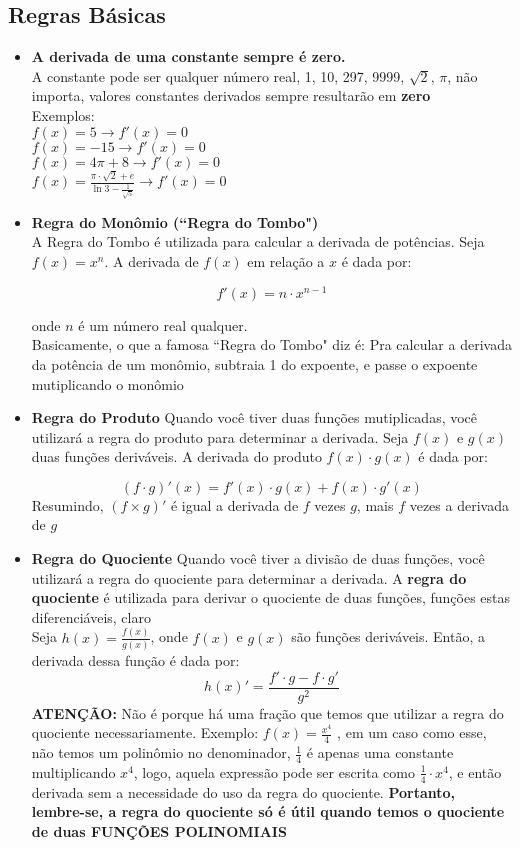 \documentclass{article}
\begin{document}
\subsection{Regras Básicas}
\begin{itemize}
    \item \textbf{A derivada de uma constante sempre é zero.}\\[10pt]A constante pode ser qualquer número real, 1, 10, 297, 9999, $\sqrt{2}$, $\pi$, não importa, valores constantes derivados sempre resultarão em \textbf{zero}\\[10pt]
    Exemplos:\\$f(x) = 5 \xrightarrow{} f'(x) = 0$\\$f(x) = -15 \xrightarrow{} f'(x) = 0$\\$f(x) = 4 \pi + 8 \xrightarrow{} f'(x) = 0$\\$f(x) = \frac{\pi \cdot \sqrt{2} + e}{\ln 3 - \frac{1}{\sqrt{5}}} \xrightarrow{} f'(x) = 0$

    \item \textbf{Regra do Monômio (``Regra do Tombo")}\\[10pt]
A Regra do Tombo é utilizada para calcular a derivada de potências. Seja \( f(x) = x^n \). A derivada de \( f(x) \) em relação a \( x \) é dada por:

\[
f'(x) = n \cdot x^{n-1}
\]

onde \( n \) é um número real qualquer.\\[10pt]Basicamente, o que a famosa ``Regra do Tombo" diz é: Pra calcular a derivada da potência de um monômio, subtraia 1 do expoente, e passe o expoente  mutiplicando o monômio

\item \textbf{Regra do Produto}
Quando você tiver duas funções mutiplicadas, você utilizará a regra do produto para determinar a derivada. Seja \( f(x) \) e \( g(x) \) duas funções deriváveis. A derivada do produto \( f(x) \cdot g(x) \) é dada por:

\[
(f \cdot g)'(x) = f'(x) \cdot g(x) + f(x) \cdot g'(x)
\]
\noindent Resumindo, $(f \times g)'$ é igual a derivada de $f$ vezes $g$, mais $f$ vezes a derivada de $g$

\item \textbf{Regra do Quociente}
Quando você tiver a divisão de duas funções, você utilizará a regra do quociente para determinar a derivada. A \textbf{regra do quociente} é utilizada para derivar o quociente de duas funções, funções estas diferenciáveis, claro\\[10pt]
Seja \(h(x) = \frac{f(x)}{g(x)} \), onde \( f(x) \) e \( g(x) \) são funções deriváveis. Então, a derivada dessa função é dada por:
\[
h(x)' = \frac{f' \cdot g - f \cdot g'}{g^2}
\]
\textbf{ATENÇÃO:} Não é porque há uma fração que temos que utilizar a regra do quociente necessariamente. Exemplo: $f(x) = \frac{x^{4}}{4}$ , em um caso como esse, não temos um polinômio no denominador, $\frac{1}{4}$ é apenas uma constante multiplicando $x^{4}$, logo, aquela expressão pode ser escrita como $\frac{1}{4} \cdot x^{4}$, e então derivada sem a necessidade do uso da regra do quociente. \textbf{Portanto, lembre-se, a regra do quociente só é útil quando temos o quociente de duas FUNÇÕES POLINOMIAIS}
\end{itemize}
\end{document}

